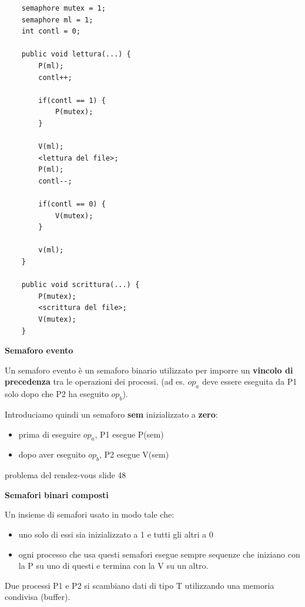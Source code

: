 \documentclass{article}
\begin{document}
\begin{lstlisting}
    semaphore mutex = 1;
    semaphore ml = 1;
    int contl = 0;

    public void lettura(...) {
        P(ml);
        contl++;

        if(contl == 1) {
            P(mutex);
        }

        V(ml);
        <lettura del file>;
        P(ml);
        contl--;

        if(contl == 0) {
            V(mutex);
        }

        v(ml);
    }

    public void scrittura(...) {
        P(mutex);
        <scrittura del file>;
        V(mutex);
    }
\end{lstlisting}

\vspace{5mm}
\textbf{Semaforo evento}

\vspace{3mm}
Un semaforo evento è un semaforo binario utilizzato per imporre un \textbf{vincolo di precedenza} tra le operazioni dei processi. 
(ad es. $op_a$ deve essere eseguita da P1 solo dopo che P2 ha eseguito $op_b$).

\vspace{3mm}
Introduciamo quindi un semaforo \textbf{sem} inizializzato a \textbf{zero}:
\begin{itemize}
    \item prima di eseguire $op_a$, P1 esegue P(sem)
    \item dopo aver eseguito $op_b$, P2 esegue V(sem)
\end{itemize}

{
    problema del rendez-vous slide 48
}

\vspace{5mm}
\textbf{Semafori binari composti}

\vspace{3mm}
Un insieme di semafori usato in modo tale che:
\begin{itemize}
    \item uno solo di essi sia inizializzato a 1 e tutti gli altri a 0
    \item ogni processo che usa questi semafori esegue sempre sequenze che iniziano con la P su uno di questi e termina con la V su un altro.
\end{itemize}

Due processi P1 e P2 si scambiano dati di tipo T utilizzando una memoria condivisa (buffer).
\end{document}
